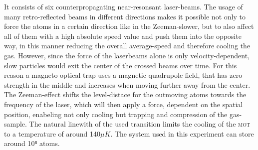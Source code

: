 It consists of six counterpropagating near-resonsant laser-beams. The usage of many retro-reflected beams in different directions makes it possible not only to force the atoms in a certain direction like in the Zeeman-slower, but to also affect all of them with a high absolute speed value and push them into the opposite way, in this manner reducing the overall average-speed and therefore cooling the gas. However, since the force of the laserbeams alone is only velocity-dependent, slow particles would exit the center of the crossed beams over time. For this reason a magneto-optical trap uses a magnetic quadrupole-field, that has zero strength in the middle and increases when moving further away from the center. The Zeeman-effect shifts the level-distace for the outmoving atoms towards the frequency of the laser, which will then apply a force, dependent on the spatial position, enabeling not only cooling but trapping and compression of the gas-sample. The natural linewith of the used transition limits the cooling of the \textsc{mot} to a temperature of around 140$\unit{\mu K}$. The system used in this experiment can store around 10⁸ atoms. 

